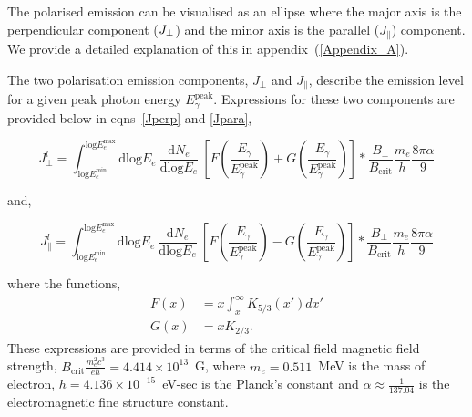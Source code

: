\documentclass[12pt, a4 paper]{mnras}
\begin{document}
The polarised emission can be visualised as an ellipse where the major axis is the perpendicular component ($J_{\rm \perp}$) and the minor axis is the parallel ($J_{\parallel}$) component. We provide a detailed explanation of this in appendix~(\ref{Appendix_A}). 

The two polarisation emission components, $J_{\perp}$ and $J_{\parallel}$, describe the emission level for a  given peak photon energy $E_{\gamma}^{\mathrm{peak}}$. Expressions for these two components are provided below in eqns~\ref{Jperp} and \ref{Jpara},

\begin{strip}
\begin{equation}
 {J_{\perp}^l} =   \int_{\mathrm{log}E_e^{\mathrm{min}}}^{\mathrm{log}E_e^{\mathrm{max}}}\mathrm{dlog}E_{e} \  \frac{\mathrm{d}N_e}{\mathrm{dlog}E_{e}} \  \left[F\left(\frac{E_{\gamma}}{E_{\gamma}^{\mathrm{peak}}}\right) + G\left(\frac{E_{\gamma}}{E_{\gamma}^{\mathrm{peak}}}\right)\right] * \frac{B_{\perp}}{B_{\mathrm{crit}}}\frac{m_{e}}{h} \frac{8\pi \alpha}{9} 
 \label{Jperp}
\end{equation}
\end{strip}

and,

\begin{strip}
\begin{equation}
{J_{\parallel}^l} = \int_{\mathrm{log}E_e^{\mathrm{min}}}^{\mathrm{log}E_e^{\mathrm{max}}}\mathrm{dlog}E_{e} \ \frac{\mathrm{d}N_e}{\mathrm{dlog}E_{e}} \  \left[F\left(\frac{E_{\gamma}}{E_{\gamma}^{\mathrm{peak}}}\right) - G\left(\frac{E_{\gamma}}{E_{\gamma}^{\mathrm{peak}}}\right)\right] * \frac{B_{\perp}}{B_{\mathrm{crit}}}\frac{m_{e}}{h} \frac{8\pi \alpha}{9}
\label{Jpara}
\end{equation}
\end{strip}

where the functions,
\begin{align}
F(x) &= x \int_x^\infty K_{5/3}(x') dx'\\
G(x) &= x K_{2/3}.
\end{align}
These expressions are provided in terms of the critical field magnetic field strength, $B_{\mathrm{crit}} \frac{m_e^2c^3}{e\hbar} = 4.414 \times 10^{13}$~G, where $m_e = 0.511$~MeV is the mass of electron, $h = 4.136 \times 10^{-15}$~eV-sec is the Planck's constant and $\alpha \approx \frac{1}{137.04}$ is the electromagnetic fine structure constant.
\end{document}
